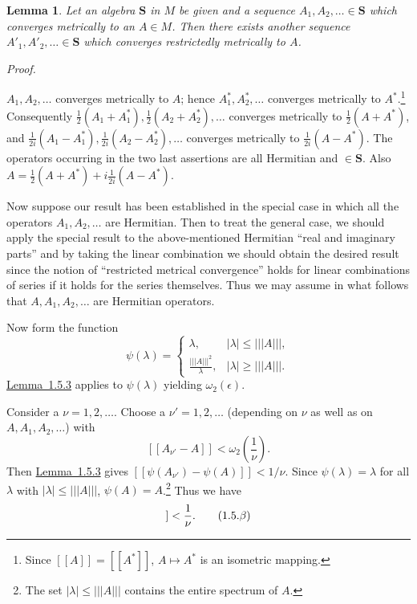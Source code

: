 \documentclass[b5paper,twoside]{article}
\newcommand{\lemref}[2]{\hyperref[#1]{\mbox{Lemma~#2}}}
\theoremstyle{mvnplain}
\newtheorem{lemma}{Lemma}[section]
\renewenvironment{proof}[1][Proof]{%
  \par\addvspace{0.35\baselineskip}%
  \noindent\textit{#1.}\ \normalfont\ignorespaces
}{%
  \par\addvspace{0.35\baselineskip}%
}
\newcommand{\M}{\mathbf M}
\newcommand{\Metric}[1]{\left[\!\left[#1\right]\!\right]}
\newcommand{\OpNorm}[1]{\left\lvert\left\lvert\left\lvert#1\right\rvert\right\rvert\right\rvert}
\def\M{M}%
\def\Metric#1{[[#1]]}%
\begin{document}
\begin{lemma}\label{lem:1.5.4}
Let an algebra $\mathbf S$ in $\M$ be given and a sequence
$A_1,A_2,\ldots\in\mathbf S$ which converges metrically to an $A\in\M$.
Then there exists another sequence $A'_1,A'_2,\ldots\in\mathbf S$ which
converges restrictedly metrically to $A$.
\end{lemma}
\begin{proof}
$A_1,A_2,\ldots$ converges metrically to $A$; hence
$A_1^*,A_2^*,\ldots$ converges metrically to $A^*$.\footnote{Since
$\Metric{A}=\Metric{A^*}$, $A\mapsto A^*$ is an isometric mapping.}
Consequently
$\frac12(A_1+A_1^*),\frac12(A_2+A_2^*),\ldots$ converges metrically to
$\frac12(A+A^*)$, and
$\frac1{2i}(A_1-A_1^*),\frac1{2i}(A_2-A_2^*),\ldots$ converges metrically
to $\frac1{2i}(A-A^*)$.  The operators occurring in the two last assertions
are all Hermitian and $\in\mathbf S$.  Also
$A=\frac12(A+A^*)+i\frac1{2i}(A-A^*)$.

Now suppose our result has been established in the special case in which all
the operators $A_1,A_2,\ldots$ are Hermitian.  Then to treat the general case,
we should apply the special result to the above-mentioned Hermitian ``real and
imaginary parts'' and by taking the linear combination we should obtain the
desired result since the notion of ``restricted metrical convergence'' holds for
linear combinations of series if it holds for the series themselves.  Thus we
may assume in what follows that $A,A_1,A_2,\ldots$ are Hermitian operators.

Now form the function
\[
  \psi(\lambda)=
  \begin{cases}
    \lambda, & |\lambda|\leq\OpNorm{A},\\[2pt]
    \displaystyle\frac{\OpNorm{A}^{2}}{\lambda},
      & |\lambda|\geq\OpNorm{A}.
  \end{cases}
\]
\lemref{lem:1.5.3}{1.5.3} applies to $\psi(\lambda)$ yielding
$\omega_2(\epsilon)$.

Consider a $\nu=1,2,\ldots$.  Choose a $\nu'=1,2,\ldots$ (depending on
$\nu$ as well as on $A,A_1,A_2,\ldots$) with
\[
  \Metric{A_{\nu'}-A}<\omega_2\!\left(\frac1\nu\right).
\]
Then \lemref{lem:1.5.3}{1.5.3} gives
$\Metric{\psi(A_{\nu'})-\psi(A)}<1/\nu$.  Since
$\psi(\lambda)=\lambda$ for all $\lambda$ with
$|\lambda|\leq\OpNorm{A}$, $\psi(A)=A$.\footnote{The set
$|\lambda|\leq\OpNorm{A}$ contains the entire spectrum of $A$.}  Thus we have
\begin{equation}
  \Metric{\psi(A_{\nu'})-A}<\frac1\nu.
  \tag{1.5.\ensuremath{\beta}}\label{eq:1.5.beta}
\end{equation}


\end{proof}
\end{document}
